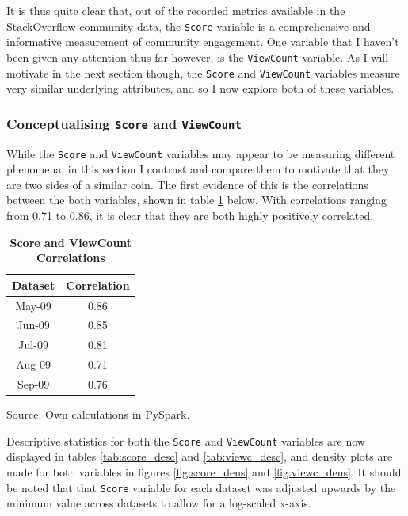 \documentclass[11pt,preprint, authoryear]{article}
\begin{document}
It is thus quite clear that, out of the recorded metrics available in
the StackOverflow community data, the \texttt{Score} variable is a
comprehensive and informative measurement of community engagement. One
variable that I haven't been given any attention thus far however, is
the \texttt{ViewCount} variable. As I will motivate in the next section
though, the \texttt{Score} and \texttt{ViewCount} variables measure very
similar underlying attributes, and so I now explore both of these
variables.

\newpage

\subsubsection{\texorpdfstring{Conceptualising \texttt{Score} and
\texttt{ViewCount}
\label{scorevc_vis}}{Conceptualising Score and ViewCount }}\label{conceptualising-score-and-viewcount}

While the \texttt{Score} and \texttt{ViewCount} variables may appear to
be measuring different phenomena, in this section I contrast and compare
them to motivate that they are two sides of a similar coin. The first
evidence of this is the correlations between the both variables, shown
in table \ref{tab:corr} below. With correlations ranging from 0.71 to
0.86, it is clear that they are both highly positively correlated.

\footnotesize

\begin{longtable} {@{} cc @{}}
\caption{\textbf{Score and ViewCount Correlations}}
\label{tab:corr}\\ 
\toprule
\textbf{Dataset} & \textbf{Correlation} \\ 
\midrule
May-09 & 0.86 \\
Jun-09 & 0.85 \\
Jul-09 & 0.81 \\
Aug-09 & 0.71 \\
Sep-09 & 0.76 \\
\bottomrule
\end{longtable}\begin{center} Source: Own calculations in PySpark.\end{center}

\normalsize

Descriptive statistics for both the \texttt{Score} and
\texttt{ViewCount} variables are now displayed in tables
\ref{tab:score_desc} and \ref{tab:viewc_desc}, and density plots are
made for both variables in figures \ref{fig:score_dens} and
\ref{fig:viewc_dens}. It should be noted that that \texttt{Score}
variable for each dataset was adjusted upwards by the minimum value
across datasets to allow for a log-scaled x-axis.
\end{document}
